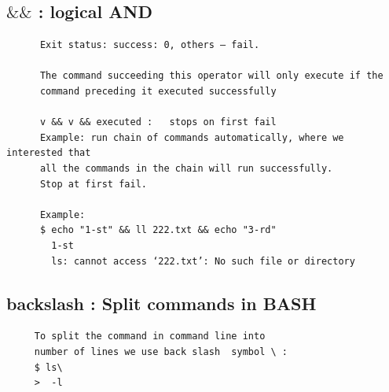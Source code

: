 \documentclass[a4paper,12pt]{article}
\begin{document}
\subsection{ $\&\&$ : logical AND}
\begin{verbatim}
      Exit status: success: 0, others – fail.
      
      The command succeeding this operator will only execute if the 
      command preceding it executed successfully

      v && v && executed :   stops on first fail
      Example: run chain of commands automatically, where we interested that 
      all the commands in the chain will run successfully. 
      Stop at first fail.

      Example:
      $ echo "1-st" && ll 222.txt && echo "3-rd"
        1-st
        ls: cannot access ‘222.txt’: No such file or directory
\end{verbatim}


\subsection{backslash : Split commands in BASH }
\begin{verbatim}
     To split the command in command line into 
     number of lines we use back slash  symbol \ :
     $ ls\
     >  -l   
           
\end{verbatim}
\end{document}
